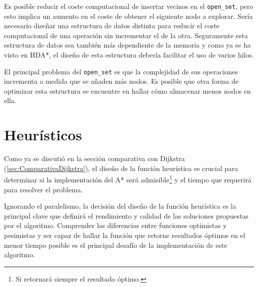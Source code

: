 Es posible reducir el coste computacional de insertar vecinos en el \lstinline{open_set},
pero esto implica un aumento en el coste de obtener el siguiente nodo a explorar.
Sería necesario diseñar una estructura de datos distinta para
reducir el coste computacional de una operación sin incrementar el de la otra.
Seguramente esta estructura de datos sea también más dependiente de la memoria
y como ya se ha visto en HDA*, el diseño de esta estructura debería
facilitar el uso de varios hilos.

El principal problema del \lstinline{open_set} es que la complejidad de sus operaciones
incrementa a medida que se añaden más nodos.
Es posible que otra forma de optimizar esta estructura se encuentre en hallar cómo
almacenar menos nodos en ella.

\section{Heurísticos}

Como ya se discutió en la sección comparativa con Dijkstra (\ref{sec:ComparativaDijkstra}),
el diseño de la función heurística es crucial para determinar si la implementación
del A* será admisible\footnote{Si retornará siempre el resultado óptimo.}
y el tiempo que requerirá para resolver el problema.

Ignorando el paralelismo, la decisión del diseño de la función heurística
es la principal clave que definirá el rendimiento y calidad de las soluciones
propuestas por el algoritmo.
Comprender las diferencias entre funciones optimistas y pesimistas
y ser capaz de hallar la función que retorne resultados óptimos en
el menor tiempo posible es el principal desafío de la implementación de este algoritmo.
